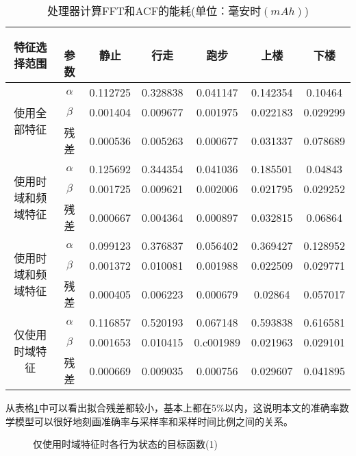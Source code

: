 \begin{table}[htb]
    \centering
    \caption{处理器计算FFT和ACF的能耗(单位：毫安时$(mAh)$)}\label{fit_result}
    \begin{tabular}{ccccccc}
    \toprule
    特征选择范围 & 　参数 & 静止 & 行走 & 跑步 & 上楼 & 下楼\\
    \midrule
    \multirow{3}{2cm}{使用全部特征} & $\alpha$ & 0.112725 & 0.328838 & 0.041147 & 0.142354 & 0.10464 \\
    & $\beta$ & 0.001404 & 0.009677 & 0.001975 & 0.022183 & 0.029299 \\
    & 残差 & 0.000536 & 0.005263 & 0.000677 & 0.031337 & 0.078689 \\
    \midrule
    \multirow{3}{2cm}{使用时域和频域特征} & $\alpha$ & 0.125692 & 0.344354 & 0.041036 & 0.185501 & 0.04843 \\
    & $\beta$ & 0.001725 & 0.009621 & 0.002006 & 0.021795 & 0.029252 \\
    & 残差 & 0.000667 & 0.004364 & 0.000897 & 0.032815 & 0.06864 \\
    \midrule
    \multirow{3}{2cm}{使用时域和频域特征} & $\alpha$ & 0.099123 & 0.376837 & 0.056402 & 0.369427 & 0.128952 \\
    & $\beta$ & 0.001372 & 0.010081 & 0.001988 & 0.022509 & 0.029771 \\
    & 残差 & 0.000405 & 0.006223 & 0.000679 & 0.02864 & 0.057017 \\
    \midrule
    \multirow{3}{2cm}{仅使用时域特征}  & $\alpha$ & 0.116857 & 0.520193 & 0.067148 & 0.593838 & 0.616581 \\
    & $\beta$ & 0.001653 & 0.010415 & 0.c001989 & 0.021963 & 0.029101 \\
    & 残差 & 0.000669 & 0.009035 & 0.000756 & 0.029607 & 0.041895 \\
    \bottomrule
    \end{tabular}
\end{table}
\par 从表格\ref{fit_result}中可以看出拟合残差都较小，基本上都在5\%以内，这说明本文的准确率数学模型可以很好地刻画准确率与采样率和采样时间比例之间的关系。

\begin{figure}[htb]
    \centering
    \caption{仅使用时域特征时各行为状态的目标函数(1)}\label{object_function1}
\end{figure}

